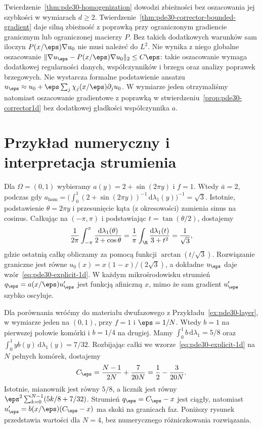 \begin{uwaga}
Twierdzenie~\ref{thm:pde30-homogenization} dowodzi zbieżności
bez oszacowania jej szybkości w wymiarach $d\ge2$.
Twierdzenie~\ref{thm:pde30-corrector-bounded-gradient}
daje silną zbieżność z poprawką przy ograniczonym
gradiencie granicznym lub ograniczonej macierzy $P$.
Bez takich dodatkowych warunków sam iloczyn
$P(x/\eps)\nabla u_0$ nie musi należeć do $L^2$.
Nie wynika z niego globalne oszacowanie
$\|\nabla u_\eps-P(x/\eps)\nabla u_0\|_2\le C\eps$:
takie oszacowanie wymaga dodatkowej regularności danych,
współczynników i brzegu oraz analizy poprawek brzegowych.
Nie wystarcza formalne podstawienie ansatzu
$u_\eps\approx u_0+\eps\sum_j\chi_j(x/\eps)\partial_j u_0$.
W wymiarze jeden otrzymaliśmy natomiast
oszacowanie gradientowe z poprawką w
stwierdzeniu~\ref{prop:pde30-corrector1d} bez dodatkowej
gładkości współczynnika $a$.
\end{uwaga}

\section{Przykład numeryczny i interpretacja strumienia}
Dla $\Omega=(0,1)$ wybieramy $a(y)=2+\sin(2\pi y)$ i $f=1$.
Wtedy $\bar a=2$, podczas gdy
$a_{\mathrm{hom}}=\bigl(\int_0^1(2+\sin(2\pi y))^{-1}
\,\mathrm d\lambda_1(y)\bigr)^{-1}=\sqrt3$.
Istotnie, podstawienie $\theta=2\pi y$ i przesunięcie
kąta (z okresowości) zamienia sinus na cosinus.
Całkując na $(-\pi,\pi)$ i podstawiając
$t=\tan(\theta/2)$, dostajemy
\[
 \frac1{2\pi}\int_{-\pi}^{\pi}
 \frac{\mathrm d\lambda_1(\theta)}{2+\cos\theta}
 =\frac1\pi\int_{\R}\frac{\mathrm d\lambda_1(t)}{3+t^2}
 =\frac1{\sqrt3},
\]
gdzie ostatnią całkę obliczamy za pomocą
funkcji $\arctan(t/\sqrt3)$.
Rozwiązanie graniczne jest równe
$u_0(x)=x(1-x)/(2\sqrt3)$, a dokładne $u_\eps$ daje
wzór~\eqref{eq:pde30-explicit-1d}. W każdym mikrośrodowisku
strumień $q_\eps=a(x/\eps)u_\eps'$ jest funkcją afiniczną
$x$, mimo że sam gradient $u_\eps'$ szybko oscyluje.

Dla porównania wróćmy do materiału dwufazowego
z Przykładu~\ref{ex:pde30-layer}, w wymiarze jeden
na $(0,1)$, przy $f=1$ i $\eps=1/N$.
Wtedy $b=1$ na pierwszej połowie komórki i
$b=1/4$ na drugiej. Mamy
$\int_0^1 b\,\mathrm d\lambda_1=5/8$ oraz
$\int_0^1 yb(y)\,\mathrm d\lambda_1(y)=7/32$.
Rozbijając całki we wzorze~\eqref{eq:pde30-explicit-1d}
na $N$ pełnych komórek, dostajemy
\[
 C_\eps=\frac{N-1}{2N}+\frac{7}{20N}
 =\frac12-\frac{3}{20N}.
\]
Istotnie, mianownik jest równy $5/8$,
a licznik jest równy
$\eps^2\sum_{k=0}^{N-1}(5k/8+7/32)$.
Strumień $q_\eps=C_\eps-x$ jest ciągły,
natomiast $u_\eps'=b(x/\eps)(C_\eps-x)$
ma skoki na granicach faz.
Poniższy rysunek przedstawia wartości dla $N=4$,
bez numerycznego różniczkowania rozwiązania.

